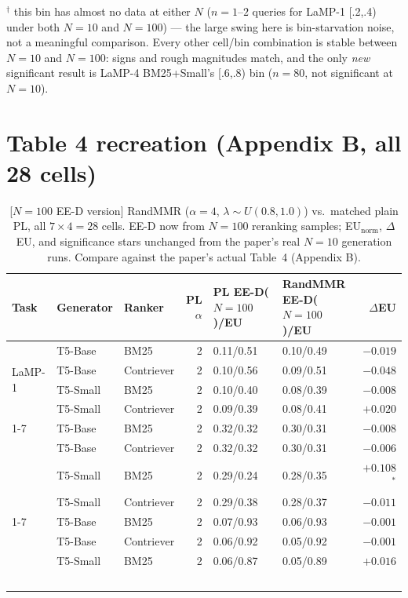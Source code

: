 \documentclass[10pt]{article}
\begin{document}
\noindent $^\dagger$ this bin has almost no data at either $N$ ($n{=}1$--$2$ queries
for LaMP-1 [.2,.4) under both $N{=}10$ and $N{=}100$) --- the large swing here is
bin-starvation noise, not a meaningful comparison. Every other cell/bin combination
is stable between $N{=}10$ and $N{=}100$: signs and rough magnitudes match, and the
only \emph{new} significant result is LaMP-4 BM25+Small's [.6,.8) bin ($n{=}80$,
not significant at $N{=}10$).

\FloatBarrier
\section{Table 4 recreation (Appendix B, all 28 cells)}

\begin{table}[h]
\centering
\scriptsize
\caption{[$N{=}100$ EE-D version] RandMMR ($\alpha{=}4$, $\lambda\sim U(0.8,1.0)$)
vs.\ matched plain PL, all $7\times4{=}28$ cells. EE-D now from $N{=}100$
reranking samples; EU$_{\text{norm}}$, $\Delta$EU, and significance stars
unchanged from the paper's real $N{=}10$ generation runs. Compare against the
paper's actual Table~4 (Appendix B).}
\begin{tabular}{@{}lllrllr@{}}
\toprule
Task & Generator & Ranker & PL $\alpha$ & PL EE-D($N{=}100$)/EU & RandMMR EE-D($N{=}100$)/EU & $\Delta$EU \\
\midrule
\multirow{4}{*}{LaMP-1}
 & T5-Base & BM25 & 2 & 0.11/0.51 & 0.10/0.49 & $-0.019$ \\
 & T5-Base & Contriever & 2 & 0.10/0.56 & 0.09/0.51 & $-0.048$ \\
 & T5-Small & BM25 & 2 & 0.10/0.40 & 0.08/0.39 & $-0.008$ \\
 & T5-Small & Contriever & 2 & 0.09/0.39 & 0.08/0.41 & $+0.020$ \\
\cmidrule(lr){1-7}
\multirow{4}{*}{LaMP-2}
 & T5-Base & BM25 & 2 & 0.32/0.32 & 0.30/0.31 & $-0.008$ \\
 & T5-Base & Contriever & 2 & 0.32/0.32 & 0.30/0.31 & $-0.006$ \\
 & T5-Small & BM25 & 2 & 0.29/0.24 & 0.28/0.35 & $+0.108$$^{*}$ \\
 & T5-Small & Contriever & 2 & 0.29/0.38 & 0.28/0.37 & $-0.011$ \\
\cmidrule(lr){1-7}
\multirow{4}{*}{LaMP-3}
 & T5-Base & BM25 & 2 & 0.07/0.93 & 0.06/0.93 & $-0.001$ \\
 & T5-Base & Contriever & 2 & 0.06/0.92 & 0.05/0.92 & $-0.001$ \\
 & T5-Small & BM25 & 2 & 0.06/0.87 & 0.05/0.89 & $+0.016$ \\
$$
\end{tabular}
\end{table}
\end{document}
